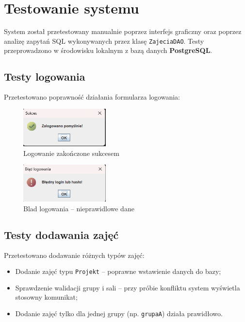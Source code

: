 \chapter{Testowanie systemu}

System został przetestowany manualnie poprzez interfejs graficzny oraz poprzez analizę zapytań SQL wykonywanych przez klasę \texttt{ZajeciaDAO}. Testy przeprowadzono w środowisku lokalnym z bazą danych \textbf{PostgreSQL}.

\section{Testy logowania}

Przetestowano poprawność działania formularza logowania:

\begin{figure}[H]
\centering
\includegraphics[width=0.4\textwidth]{figures/approve/approve_login.png}
\caption{Logowanie zakończone sukcesem}
\end{figure}

\begin{figure}[H]
\centering
\includegraphics[width=0.4\textwidth]{figures/Errors/bad_login.png}
\caption{Blad logowania – nieprawidlowe dane}
\end{figure}

\section{Testy dodawania zajęć}

Przetestowano dodawanie różnych typów zajęć:

\begin{itemize}
    \item Dodanie zajęć typu \texttt{Projekt} – poprawne wstawienie danych do bazy;
    \item Sprawdzenie walidacji grupy i sali – przy próbie konfliktu system wyświetla stosowny komunikat;
    \item Dodanie zajęć tylko dla jednej grupy (np. \texttt{grupaA}) działa prawidłowo.
\end{itemize}

